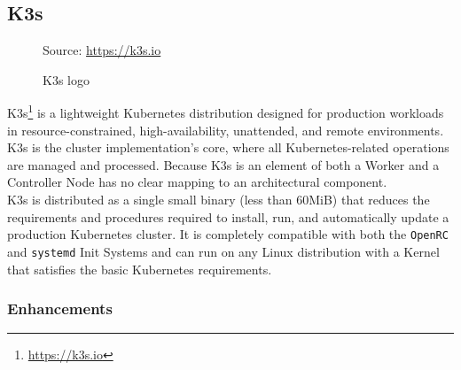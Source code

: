 \subsection{K3s}
\label{subsec:implementation_dependencies_k3s}

\begin{figure} %
  \centering
  \def\stackalignment{l} %
  {\scriptsize \parbox[t]{\linewidth}{ Source: \url{https://k3s.io}} }
  \caption{K3s logo}
\end{figure}

K3s\footnote{\url{https://k3s.io}} is a lightweight Kubernetes distribution designed
for production workloads in resource-constrained, high-availability, unattended,
and remote environments. K3s is the cluster implementation's core, where all
Kubernetes-related operations are managed and processed. Because K3s is an element
of both a Worker and a Controller Node has no clear mapping to an architectural component.
\\ %
K3s is distributed as a single small binary (less than 60MiB) that reduces the requirements
and procedures required to install, run, and automatically update a production Kubernetes
cluster. It is completely compatible with both the \texttt{OpenRC} and \texttt{systemd}
Init Systems and can run on any Linux distribution with a Kernel that satisfies
the basic Kubernetes requirements.

\subsubsection{Enhancements}
\label{subsubsec:implementation_dependencies_k3s_enhancements}

